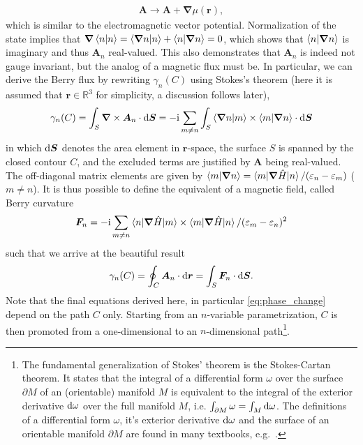 \begin{align}
    \bm A \rightarrow {\bm A} + \bm\nabla\mu(\bm r),
\end{align}
which is similar to the electromagnetic vector potential.
Normalization of the state implies that $\bm\nabla \braket{n|n} = \braket{\bm\nabla n|n} + \braket{n|\bm\nabla n} = 0$, which shows that $\braket{n|\bm\nabla n}$ is imaginary and thus ${\bm A_n}$ real-valued.
This also demonstrates that $\bm A_n$ is indeed not gauge invariant, but the analog of a magnetic flux must be.
In particular, we can derive the Berry flux by rewriting $\gamma_n(C)$ using Stokes's theorem (here it is assumed that $\bm r\in\mathds R^3$ for simplicity, a discussion follows later),
\begin{align}
    \gamma_n(C) = \int_S{\bm\nabla}\times{\bm A_n}\cdot\mathrm d{\bm S} = -\mathrm i\sum_{m\neq n}\int_S\braket{\bm\nabla n|m}\times\braket{m|\bm\nabla n}\cdot \mathrm d{\bm S}
    \label{eq:berry_phase_stokes_theorem}
\end{align}
in which $\mathrm d{\bm S}$ denotes the area element in ${\bm r}$-space, the surface $S$ is spanned by the closed contour $C$, and the excluded terms are justified by $\bm A$ being real-valued.
The off-diagonal matrix elements are given by $\braket{m|{\bm\nabla} n} = \braket{m|\bm\nabla\hat H|n}/(\varepsilon_n-\varepsilon_m)$ ($m\neq n$).
It is thus possible to define the equivalent of a magnetic field, called Berry curvature
\begin{align}
    \bm F_n = -\mathrm i\sum_{m\neq n}\braket{n|\bm\nabla\hat H|m}\times\braket{m|\bm\nabla\hat H|n}/(\varepsilon_m-\varepsilon_n)^2
\end{align}
such that we arrive at the beautiful result
\begin{align}
    \gamma_n(C) = \oint_C{\bm A_n}\cdot\mathrm d \bm r = \int_S {\bm F_n}\cdot\mathrm d{\bm S}.
    \label{eq:berry_phase_stokes_theorem_2}
\end{align}
Note that the final equations derived here, in particular \cref{eq:phase_change} depend on the path $C$ only.
Starting from an $n$-variable parametrization, $C$ is then promoted from a one-dimensional to an $n$-dimensional path\footnote{
    The fundamental generalization of Stokes' theorem is the Stokes-Cartan theorem.
    It states that the integral of a differential form $\omega$ over the surface $\partial M$ of an (orientable) manifold $M$ is equivalent to the integral of the exterior derivative $\mathrm d\omega$ over the full manifold $M$, i.e. $\int_{\partial M}\omega = \int_M\mathrm d\omega$.
    The definitions of a differential form $\omega$, it's exterior derivative $\mathrm d\omega$ and the surface of an orientable manifold $\partial M$ are found in many textbooks, e.g.~\cite{Nakahara1990}.
}.

